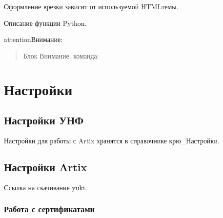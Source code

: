 \documentclass[twoside,11pt,a4paper,notitlepage]{report}
\begin{document}
\begin{sphinxShadowBox}

\sphinxAtStartPar
Оформление врезки зависит от используемой HTML\sphinxhyphen{}темы.
\end{sphinxShadowBox}

\begin{fulllineitems}
\label{\detokenize{prox:pyfunc}}
\pysigstartsignatures
{}
\pysigstopsignatures
\sphinxAtStartPar
Описание функции Python.

\end{fulllineitems}


\begin{sphinxadmonition}{attention}{Внимание:}\begin{quote}

\sphinxAtStartPar
Блок Внимание, команда:
\end{quote}
\end{sphinxadmonition}

\sphinxstepscope


\chapter{Настройки}
\label{\detokenize{setting:id1}}\label{\detokenize{setting::doc}}

\section{Настройки УНФ}
\label{\detokenize{setting:id2}}
\sphinxAtStartPar
Настройки для работы с Artix хранятся в справочнике  крю\_Настройки.


\section{Настройки Artix}
\label{\detokenize{setting:artix}}
\sphinxAtStartPar
Ссылка на скачивание yuki.


\subsection{Работа с сертификатами}
\label{\detokenize{setting:id3}}
\sphinxAtStartPar
{}
\end{document}
